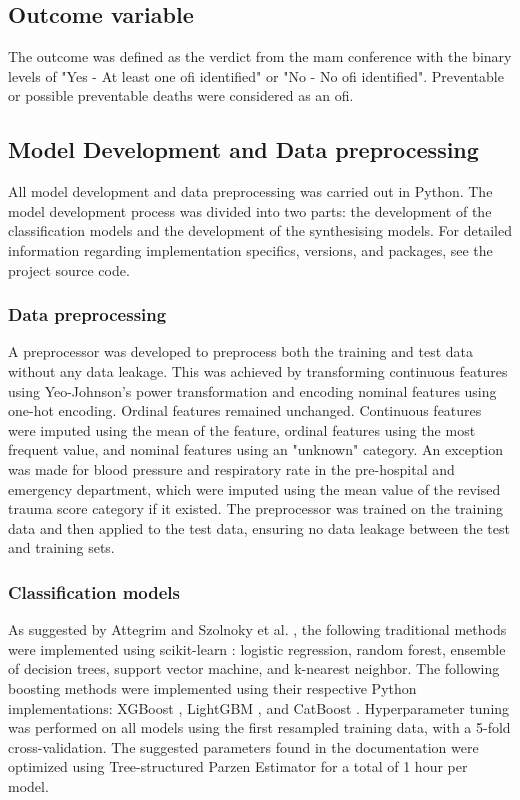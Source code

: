 \documentclass[12pt, a4paper]{article}
\begin{document}
\subsection{Outcome variable}
The outcome was defined as the verdict from the \acrshort{mam} conference with the binary levels of "Yes - At least one \acrshort{ofi} identified" or "No - No \acrshort{ofi} identified". Preventable or possible preventable deaths were considered as an \acrshort{ofi}.

\subsection{Model Development and Data preprocessing}
All model development and data preprocessing was carried out in Python. The model development process was divided into two parts: the development of the classification models and the development of the synthesising models. For detailed information regarding implementation specifics, versions, and packages, see the project source code.

\subsubsection*{Data preprocessing}
A preprocessor was developed to preprocess both the training and test data without any data leakage. This was achieved by transforming continuous features using Yeo-Johnson's power transformation \cite{yeo_new_2000} and encoding nominal features using one-hot encoding. Ordinal features remained unchanged. Continuous features were imputed using the mean of the feature, ordinal features using the most frequent value, and nominal features using an "unknown" category. An exception was made for blood pressure and respiratory rate in the pre-hospital and emergency department, which were imputed using the mean value of the revised trauma score category \cite{ringdal_utstein_2008} if it existed. The preprocessor was trained on the training data and then applied to the test data, ensuring no data leakage between the test and training sets.

\subsubsection*{Classification models}
As suggested by Attegrim and Szolnoky et al. \cite{attergrim_predicting_2023}, the following traditional methods were implemented using scikit-learn \cite{pedregosa_scikit_2011}: logistic regression, random forest, ensemble of decision trees, support vector machine, and k-nearest neighbor. The following boosting methods were implemented using their respective Python implementations: XGBoost \cite{chen_xgboost_2016}, LightGBM \cite{ke_lightgbm_2017}, and CatBoost \cite{prokhorenkova_catboost_2018}. Hyperparameter tuning was performed on all models using the first resampled training data, with a 5-fold cross-validation. The suggested parameters found in the documentation were optimized using Tree-structured Parzen Estimator \cite{bergstra_algorithms_2011} for a total of 1 hour per model.
\end{document}
